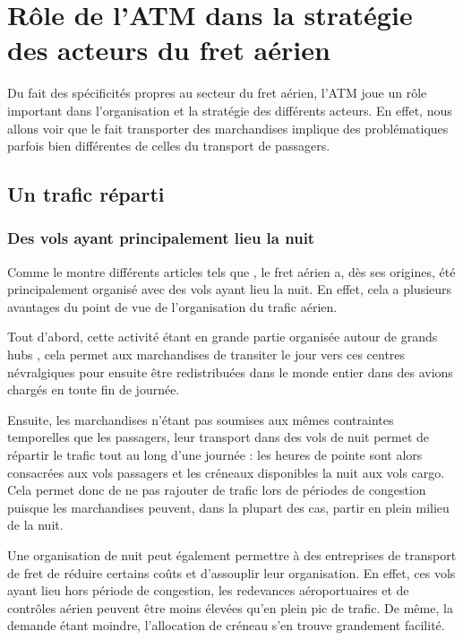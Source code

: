 \section{Rôle de l'ATM dans la stratégie des acteurs du fret aérien}


Du fait des spécificités propres au secteur du fret aérien, l'ATM joue un rôle important dans l'organisation et la stratégie des différents acteurs. En effet, nous allons voir que le fait transporter des marchandises implique des problématiques parfois bien différentes de celles du transport de passagers.

\subsection{Un trafic réparti}

\subsubsection{Des vols ayant principalement lieu la nuit}

Comme le montre différents articles tels que \cite{popescu}, le fret aérien a, dès ses origines, été principalement organisé avec des vols ayant lieu la nuit. En effet, cela a plusieurs avantages du point de vue de l'organisation du trafic aérien. 

Tout d'abord, cette activité étant en grande partie organisée autour de grands hubs \cite{Walcott201764}, cela permet aux marchandises de transiter le jour vers ces centres névralgiques pour ensuite être redistribuées dans le monde entier dans des avions chargés en toute fin de journée. 

Ensuite, les marchandises n'étant pas soumises aux mêmes contraintes temporelles que les passagers, leur transport dans des vols de nuit permet de répartir le trafic tout au long d'une journée : les heures de pointe sont alors consacrées aux vols passagers et les créneaux disponibles la nuit aux vols cargo. Cela permet donc de ne pas rajouter de trafic lors de périodes de congestion puisque les marchandises peuvent, dans la plupart des cas, partir en plein milieu de la nuit.

Une organisation de nuit peut également permettre à des entreprises de transport de fret de réduire certains coûts et d'assouplir leur organisation. En effet, ces vols ayant lieu hors période de congestion, les redevances aéroportuaires et de contrôles aérien peuvent être moins élevées qu'en plein pic de trafic. De même, la demande étant moindre, l'allocation de créneau s'en trouve grandement facilité.

